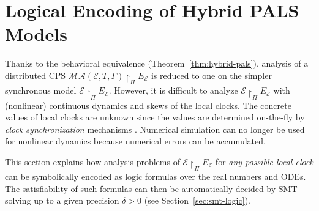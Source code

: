 

\section{Logical Encoding of Hybrid PALS Models}
\label{sec:smt-encoding}

Thanks to the behavioral equivalence (Theorem~\ref{thm:hybrid-pals}),
analysis of a distributed CPS $\mathcal{MA}(\mathcal{E}, T, \Gamma) \restriction_{\Pi} E_\mathcal{E}$
is reduced to one on the simpler synchronous model $\mathcal{E} \restriction_{\Pi} E_\mathcal{E}$.
However, it is difficult to analyze $\mathcal{E} \restriction_{\Pi} E_\mathcal{E}$ 
with (nonlinear)  continuous dynamics and skews of the local clocks.
The concrete values of local clocks are unknown since the values %
are determined on-the-fly by  \emph{clock synchronization} mechanisms \cite{pals-rtss09,lynch-book}.
Numerical simulation can no longer be used for nonlinear dynamics
because numerical errors can be accumulated.

This section explains how analysis problems of 
$\mathcal{E}\restriction_{\Pi}E_\mathcal{E}$ for \emph{any possible local clock}
can be symbolically encoded as logic formulas over the real numbers and ODEs.
The satisfiability of such formulas can then be automatically decided by SMT solving up to a given precision $\delta > 0$
(see Section~\ref{sec:smt-logic}).


